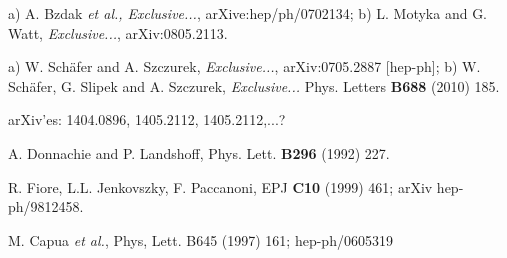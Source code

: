 \documentclass[12pt]{article}
\begin{document}
\begin{thebibliography}{99}
 a) A. Bzdak {\it et al., Exclusive...}, arXive:hep/ph/0702134; b) L. Motyka and G. Watt, {\it Exclusive...}, arXiv:0805.2113.

 a) W. Sch\"afer and A. Szczurek, {\it Exclusive...}, arXiv:0705.2887 [hep-ph]; b) W. Sch\"afer, G. Slipek and A. Szczurek,
{\it Exclusive...} Phys. Letters {\bf B688} (2010) 185.

 arXiv'es: 1404.0896, 1405.2112, 1405.2112,...?

 A. Donnachie and P. Landshoff, Phys. Lett. {\bf B296} (1992) 227.

 R. Fiore, L.L. Jenkovszky, F. Paccanoni, EPJ {\bf C10} (1999) 461; arXiv hep-ph/9812458.

 M. Capua {\it et al.}, Phys, Lett. {B645} (1997) 161; hep-ph/0605319


\end{thebibliography}
\end{document}
